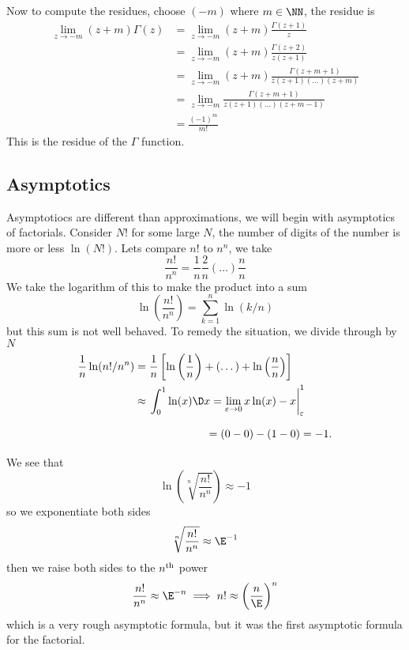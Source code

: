 Now to compute the residues, choose $(-m)$ where $m\in\NN$, the
residue is
\begin{subequations}
\begin{align}
\lim_{z\to-m}(z+m)\Gamma(z)
&=\lim_{z\to-m}(z+m)\frac{\Gamma(z+1)}{z}\\
&=\lim_{z\to-m}(z+m)\frac{\Gamma(z+2)}{z(z+1)}\\
&=\lim_{z\to-m}(z+m)\frac{\Gamma(z+m+1)}{z(z+1)(\dots)(z+m)}\\
&=\lim_{z\to-m}\frac{\Gamma(z+m+1)}{z(z+1)(\dots)(z+m-1)}\\
&=\frac{(-1)^{m}}{m!}
\end{align}
\end{subequations}
This is the residue of the $\Gamma$ function.

\subsection{Asymptotics}

Asymptotiocs are different than approximations, we will begin
with asymptotics of factorials. Consider $N!$ for some large $N$,
the number of digits of the number is more or less
$\ln(N!)$. Lets compare $n!$ to $n^{n}$, we take
\begin{equation}
\frac{n!}{n^{n}}=\frac{1}{n}\frac{2}{n}(\dots)\frac{n}{n}
\end{equation}
We take the logarithm of this to make the product into a sum
\begin{equation}
\ln\left(\frac{n!}{n^{n}}\right)=\sum^{n}_{k=1}\ln(k/n)
\end{equation}
but this sum is not well behaved. To remedy the situation, we
divide through by $N$
\begin{subequations}
\begin{align}
\frac{1}{n}\ln(n!/n^{n}) &= \frac{1}{n}\left[\ln\left(\frac{1}{n}\right)+(\dots)+\ln\left(\frac{n}{n}\right)\right]\\
&\approx\left.\int^{1}_{0}\ln(x)\D x = \lim_{\varepsilon\to0}x\ln(x)-x\right|^{1}_{\varepsilon}\\
&\phantom{\approx\int^{1}_{0}\ln(x)\D x} = (0-0)-(1-0)=-1.
\end{align}
\end{subequations}
We see that
\begin{equation}
\ln\left(\sqrt[n]{\frac{n!}{n^{n}}}\right)\approx-1
\end{equation}
so we exponentiate both sides
\begin{equation}
\sqrt[n]{\frac{n!}{n^{n}}}\approx\E^{-1}
\end{equation}
then we raise both sides to the $n^{\rm th}$ power
\begin{equation}
\frac{n!}{n^{n}}\approx\E^{-n}\implies
n!\approx\left(\frac{n}{\E}\right)^{n}
\end{equation}
which is a very rough asymptotic formula, but it was the first
asymptotic formula for the factorial.

